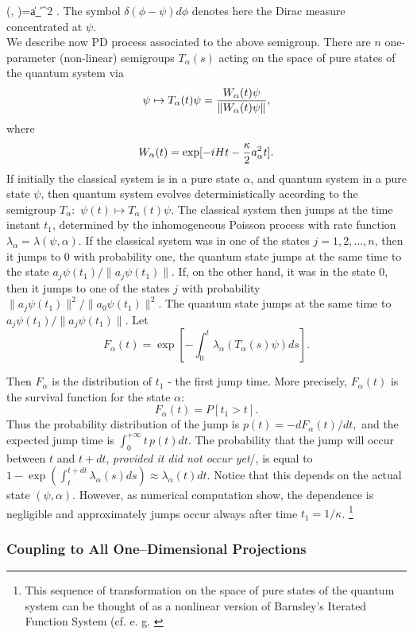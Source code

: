 \documentclass[12pt]{article}
\begin{document}
\lambda  (\psi , \alpha )=\kappa \| a_\alpha\psi\|^2 . 
\ee 
The symbol $\delta \left (\phi - \psi\right)d\phi$ denotes here the
Dirac measure concentrated at $\psi . $\\
We describe now PD process associated to the above semigroup. 
There are $n$ one-parameter  (non-linear) semigroups $T_\alpha  (s)$ acting on the 
space  of pure states of the quantum system via
$$\psi \mapsto T_\alpha  (t) \psi ={ W_\alpha  (t) \psi  \over
\| W_\alpha  (t)\psi \|}, $$ where
$$W_\alpha  (t)=\exp[-iHt-{\kappa\over 2} a_\alpha^2 t]. $$ If initially the
classical system is in a pure state $\alpha$,   and quantum system  in
a pure state
$\psi$,   then quantum system evolves deterministically according to the 
semigroup
$T_\alpha$:\, $\psi (t)\mapsto T_\alpha  (t)\psi$. 
 The classical system then jumps at
the time instant
$t_1$,  determined by  the inhomogeneous Poisson process with rate function
$\lambda_\alpha = \lambda(\psi,\alpha)$.
If the classical system was in one of the states
$j=1, 2, \ldots , n$,  then it jumps to
$0$ with probability one,  the quantum state jumps at the same time to the state
$a_j\psi  (t_1) / \| a_j\psi  (t_1)\|$. 
If,  on the other hand,  it was in the state $0$,  then it jumps to one of the
states $j$ with  probability
$\|a_j\psi  (t_1)\|^2/\|a_0 \psi  (t_1)\|^2$.  The quantum state jumps at the same
time to
$a_j\psi (t_1)/\|a_j\psi (t_1)\|. $ Let 
$$F_\alpha  (t)=\exp[-\int_0^t \lambda_\alpha  (T_\alpha  (s)\psi)ds]. $$
 
Then $F_\alpha$ is the distribution of $t_1$ - the first jump time.  More
precisely, 
$F_\alpha  (t)$ is the survival function for the state $\alpha$:
$$F_\alpha  (t) = P[t_1> t]. $$ Thus the probability distribution of the jump is
$p (t)=-dF_\alpha  (t)/dt ,  $ and the expected jump time is $\int_0^{+\infty } t\, 
p (t) dt. $  The probability that the jump will occur between $t$ and
$t+dt$, {\em provided it did not occur yet}/, is
equal to
$1-\exp\left(\int_t^{t+dt}\lambda_{\alpha}(s)ds\right)\approx
\lambda_{\alpha}(t)dt$.
Notice that this depends on the actual state $(\psi,\alpha)$.
However,  as numerical
computation show,  the dependence  is negligible and approximately
 jumps occur always after time $t_1=1/\kappa$.%
\footnote{This sequence of transformation on the space of pure states of the
quantum system can be thought of as a nonlinear version of Barnsley's Iterated
Function System  (cf.  e. g.  \cite{bar}  }
\subsubsection{Coupling to All One--Dimensional Projections}
\end{document}
